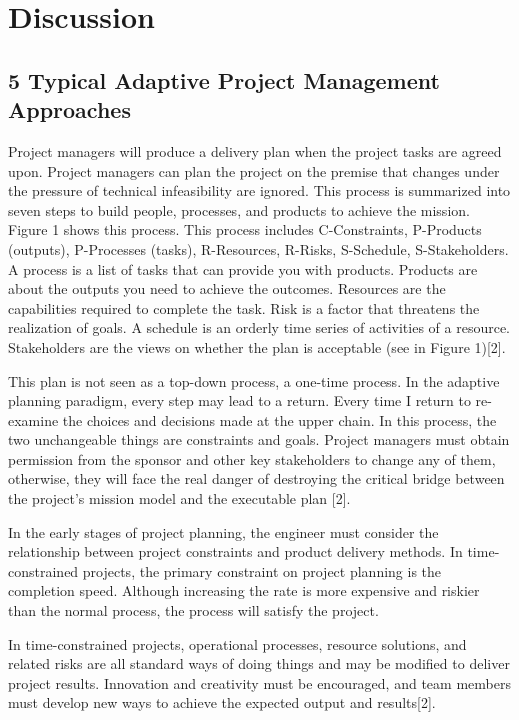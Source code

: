 \documentclass{sigchi}
\begin{document}
\section{Discussion}


\subsection{5 Typical Adaptive Project Management Approaches }

Project managers will produce a delivery plan when the project tasks are agreed upon. Project managers can plan the project on the premise that changes under the pressure of technical infeasibility are ignored. This process is summarized into seven steps to build people, processes, and products to achieve the mission. Figure 1 shows this process. This process includes C-Constraints, P-Products (outputs), P-Processes (tasks), R-Resources, R-Risks, S-Schedule, S-Stakeholders. A process is a list of tasks that can provide you with products. Products are about the outputs you need to achieve the outcomes. Resources are the capabilities required to complete the task. Risk is a factor that threatens the realization of goals. A schedule is an orderly time series of activities of a resource. Stakeholders are the views on whether the plan is acceptable (see in Figure 1)[2].

This plan is not seen as a top-down process, a one-time process. In the adaptive planning paradigm, every step may lead to a return. Every time I return to re-examine the choices and decisions made at the upper chain. In this process, the two unchangeable things are constraints and goals. Project managers must obtain permission from the sponsor and other key stakeholders to change any of them, otherwise, they will face the real danger of destroying the critical bridge between the project’s mission model and the executable plan [2].

In the early stages of project planning, the engineer must consider the relationship between project constraints and product delivery methods. In time-constrained projects, the primary constraint on project planning is the completion speed. Although increasing the rate is more expensive and riskier than the normal process, the process will satisfy the project.

In time-constrained projects, operational processes, resource solutions, and related risks are all standard ways of doing things and may be modified to deliver project results. Innovation and creativity must be encouraged, and team members must develop new ways to achieve the expected output and results[2].
\end{document}
